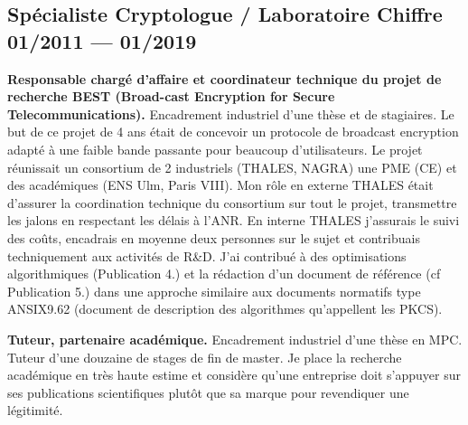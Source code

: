 \subsection{{Spécialiste Cryptologue / Laboratoire Chiffre \hfill 01/2011 --- 01/2019}}
\begin{zitemize}
\item {\bf Responsable chargé d'affaire et coordinateur technique du projet de recherche BEST (Broad-cast Encryption for Secure Telecommunications).} Encadrement industriel d'une thèse et de stagiaires. Le but de ce projet de 4 ans était de concevoir un protocole de broadcast encryption adapté à une faible bande passante pour beaucoup d'utilisateurs. Le projet réunissait un consortium de 2 industriels (THALES, NAGRA) une PME (CE) et des académiques (ENS Ulm, Paris VIII). Mon rôle en externe THALES était d'assurer la coordination technique du consortium sur tout le projet, transmettre les jalons en respectant les délais à l'ANR. En interne THALES j'assurais le suivi des coûts, encadrais en moyenne deux personnes sur le sujet et contribuais techniquement aux activités de R\&D. J'ai contribué à des optimisations algorithmiques (Publication 4.) et la rédaction d'un document de référence (cf Publication 5.) dans une approche similaire aux documents normatifs type ANSIX9.62 (document de description des algorithmes qu'appellent les PKCS).
 
\item {\bf Tuteur, partenaire académique.} Encadrement industriel d'une thèse en MPC. Tuteur d'une douzaine de stages de fin de master. Je place la recherche académique en très haute estime et considère qu'une entreprise doit s'appuyer sur ses publications scientifiques plutôt que sa marque pour revendiquer une légitimité.  
\end{zitemize}


